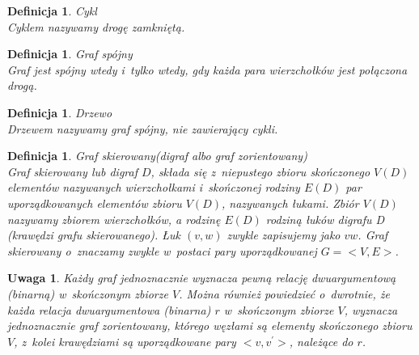 \documentclass[12pt,a4paper]{report}
\newtheorem{definition}[theorem]{Definicja}
\newtheorem{uwaga}{Uwaga}
\begin{document}
\begin{definition}{Cykl \cite[Rozdział 3]{wilson2008}}\\
Cyklem nazywamy drogę zamkniętą.
\end{definition}


\begin{definition}{Graf spójny \cite[Rozdział 3]{wilson2008}}\\
Graf jest spójny wtedy i~tylko wtedy, gdy każda para wierzchołków jest połączona drogą.
\end{definition}


\begin{definition}{Drzewo \cite[Rozdział 4]{wilson2008}}\\
Drzewem nazywamy graf spójny, nie zawierający cykli.
\end{definition}

\begin{definition}{Graf skierowany(digraf albo graf zorientowany) \cite[Rozdział 7]{wilson2008}}\\
Graf skierowany lub digraf $D$, składa się z~niepustego zbioru skończonego $V(D)$ elementów nazywanych wierzchołkami i~skończonej rodziny $E(D)$ par uporządkowanych elementów zbioru $V(D)$, nazywanych łukami. Zbiór $V(D)$ nazywamy zbiorem wierzchołków, a rodzinę $E(D)$ rodziną łuków digrafu D (krawędzi grafu skierowanego). Łuk $(v,w)$ zwykle zapisujemy jako $vw$. Graf skierowany o~znaczamy zwykle w~postaci pary uporządkowanej $G=<V,E>$.
\end{definition}

\begin{uwaga}
Każdy graf jednoznacznie wyznacza pewną relację dwuargumentową (binarną) w~skończonym zbiorze $V$. Można również powiedzieć o~dwrotnie, że każda relacja dwuargumentowa (binarna) $r$ w~skończonym zbiorze $V$, wyznacza jednoznacznie graf zorientowany, którego węzłami są elementy skończonego zbioru $V$, z~kolei krawędziami są uporządkowane pary $<v,v^{'}>$, należące do $r$. 
\end{uwaga}
\end{document}
